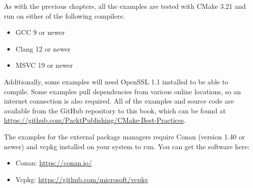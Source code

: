 As with the previous chapters, all the examples are tested with CMake 3.21 and run on either of the following compilers:

\begin{itemize}
\item 
GCC 9 or newer

\item 
Clang 12 or newer

\item 
MSVC 19 or newer
\end{itemize}

Additionally, some examples will need OpenSSL 1.1 installed to be able to compile. Some examples pull dependencies from various online locations, so an internet connection is also required. All of the examples and source code are available from the GitHub repository to this book, which can be found at \url{https://github.com/PacktPublishing/CMake-Best-Practices}.

The examples for the external package managers require Conan (version 1.40 or newer) and vcpkg installed on your system to run. You can get the software here:

\begin{itemize}
\item 
Conan: \url{https://conan.io/}

\item 
Vcpkg: \url{https://github.com/microsoft/vcpkg}
\end{itemize}
































